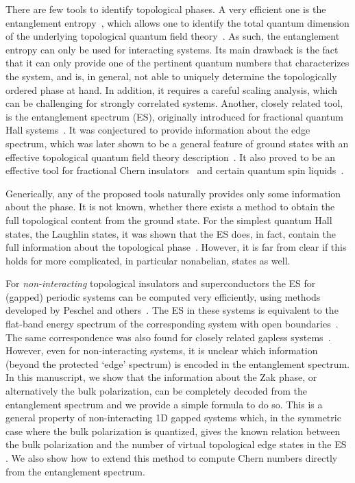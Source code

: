 \documentclass[twocolumn,amsmath,longbibliography,amssymb,superscriptaddress]{revtex4-1}
\newcommand{\mariac}[1]{{\it\color{cyan}#1}}
\begin{document}
There are few tools to identify topological phases. 
A very efficient one is the entanglement entropy~\cite{srednicki1993entropy}, which allows one to identify the total quantum dimension of the underlying topological quantum field theory~\cite{Kitaev2006topological, Levin2006detecting}. 
As such, the entanglement entropy can only be used for interacting systems. 
Its main drawback is the fact that it can only provide one of the pertinent quantum numbers that characterizes the system, and is, in general,  not able to uniquely determine the topologically ordered phase at hand. 
In addition, it requires a careful scaling analysis, which can be challenging for strongly correlated systems. 
Another, closely related tool, is the entanglement spectrum (ES), originally introduced for fractional quantum Hall systems~\cite{Li2008entanglement}. 
It was conjectured to provide information about the edge spectrum, which was later shown to be a general feature of ground states with an effective topological quantum field theory description~\cite{Qi2012general}. 
It also proved to be an effective tool for fractional Chern insulators~\cite{Regnault2011fractional} and certain quantum spin liquids~\cite{yao2010entanglement}. %

Generically, any of the proposed tools naturally provides only some information about the phase. It is not known, whether there exists a method to obtain the full topological content from the ground state. 
For the simplest quantum Hall states, the Laughlin states,  it was shown that the ES does, in fact, contain the full information about the topological phase~\cite{hermanns2011haldane}.
However, it is far from clear if this holds for more complicated, in particular nonabelian, states as well.  


For \emph{non-interacting} topological insulators  and superconductors the ES for (gapped) periodic systems can be computed very efficiently, using methods developed by Peschel and others~\cite{Peschel2003}. The ES in these systems is equivalent to the flat-band energy spectrum of the corresponding system with open boundaries~\cite{Fidkowski2010entanglement}. The same correspondence was also found for closely related gapless systems~\cite{Matern2018entanglement}. However, even for non-interacting systems, it is unclear which information (beyond the protected `edge' spectrum) is encoded in the entanglement spectrum. In this manuscript, we show that the information about the Zak phase, or alternatively the bulk polarization, can be completely decoded from the entanglement spectrum and we provide a simple formula to do so. This is a general property of non-interacting 1D gapped systems which, in the symmetric case where the bulk polarization is quantized, gives the known relation between the bulk polarization and the number of virtual topological edge states in the ES \cite{Ryu2006}. We also show how to extend this method to compute Chern numbers directly from the entanglement spectrum. 
\end{document}

